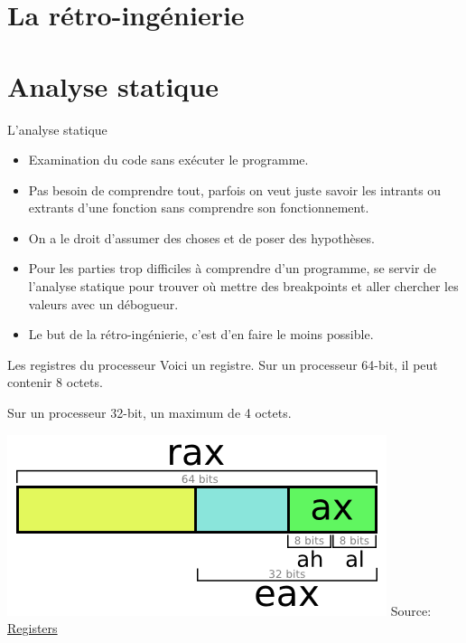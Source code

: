 \documentclass[10pt,xcolor={table,dvipsnames},t]{beamer}
\begin{document}
\section{La rétro-ingénierie}


\section{Analyse statique}

\begin{frame}{L'analyse statique}

\begin{itemize}
    \item Examination du code sans exécuter le programme.
    \item Pas besoin de comprendre tout, parfois on veut juste savoir les intrants ou extrants d'une fonction sans comprendre son fonctionnement.
    \item On a le droit d'assumer des choses et de poser des hypothèses.
    \item Pour les parties trop difficiles à comprendre d'un programme, se servir de l'analyse statique pour trouver où mettre des breakpoints et aller chercher les valeurs avec un débogueur. 
    \item Le but de la rétro-ingénierie, c'est d'en faire le moins possible.
\end{itemize}


\end{frame}



\begin{frame}{Les registres du processeur}
    Voici un registre. Sur un processeur 64-bit, il peut contenir 8 octets. 
    
    Sur un processeur 32-bit, un maximum de 4 octets. 
    
    \begin{center}
    \includegraphics[width=.60\textwidth,height=.40\textheight]{Register}\newline{}
    Source: \href{http://blog.jpauli.tech/2016-11-30-on-c-performances-html/}{Registers}
    \end{center}
\end{frame}
\end{document}
